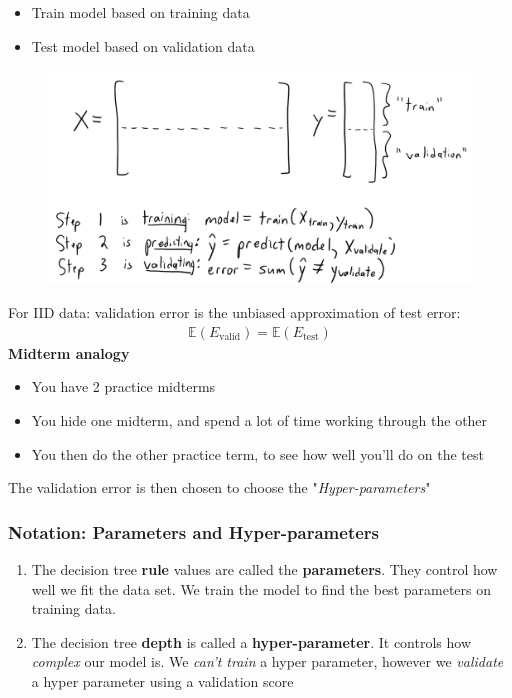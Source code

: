 \documentclass{article}
\theoremstyle{definition}
\begin{document}
\begin{itemize}
	\item \textcolor{OliveGreen}{Train model based on training data}
	\item \textcolor{OliveGreen}{Test model based on validation data}
\end{itemize}
\begin{figure}[H]
	\centering
	\includegraphics[width = 4.5in]{Pic10}
\end{figure}
For IID data: validation error is the unbiased approximation of test error:
\begin{align*}
	\mathbb{E}(E_{\text{valid}}) = \mathbb{E}(E_{\text{test}})
\end{align*}
\textbf{Midterm analogy}
\begin{itemize}
	\item You have 2 practice midterms
	\item You hide one midterm, and spend a lot of time working through the other
	\item You then do the other practice term, to see how well you’ll do on the test
\end{itemize}
The validation error is then chosen to choose the "\textsl{Hyper-parameters}"

\subsubsection*{Notation: Parameters and Hyper-parameters}
\begin{enumerate}
	\item The decision tree \textbf{rule} values are called the \textbf{parameters}. They control how well we fit the data set. We train the model to find the best parameters on training data.
	\item The decision tree \textbf{depth} is called a \textbf{hyper-parameter}. It controls how \textsl{complex} our model is. We \textsl{can't train} a hyper parameter, however we \textsl{validate} a hyper parameter using a validation score
\end{enumerate}
\end{document}
